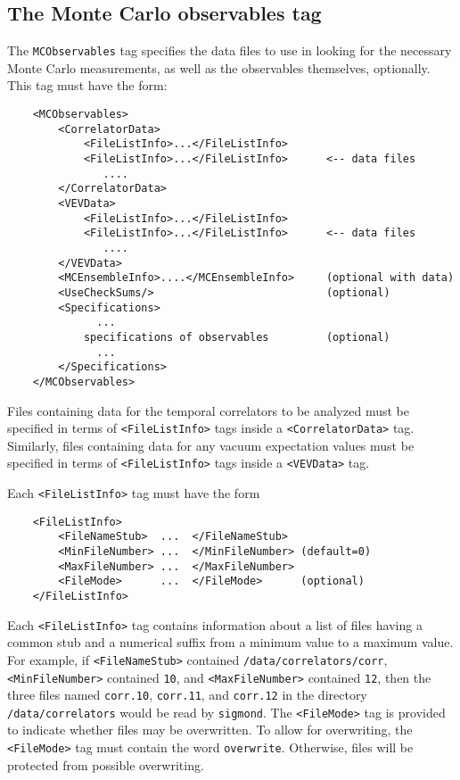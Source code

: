 \documentclass[12pt]{article}
\newcommand{\vb}{\texttt}
\begin{document}
\subsection{The Monte Carlo observables tag}
The \vb{MCObservables} tag specifies the data files to use in looking
for the necessary Monte Carlo measurements, as well as the observables
themselves, optionally.  This tag must have the form:
\begin{verbatim}
    <MCObservables>
        <CorrelatorData>
            <FileListInfo>...</FileListInfo>
            <FileListInfo>...</FileListInfo>      <-- data files
               .... 
        </CorrelatorData>
        <VEVData> 
            <FileListInfo>...</FileListInfo>
            <FileListInfo>...</FileListInfo>      <-- data files
               ....
        </VEVData>
        <MCEnsembleInfo>....</MCEnsembleInfo>     (optional with data)
        <UseCheckSums/>                           (optional)
        <Specifications>
              ... 
            specifications of observables         (optional)
              ...   
        </Specifications>
    </MCObservables>
\end{verbatim}

Files containing data for the temporal correlators to be analyzed
must be specified in terms of \vb{<FileListInfo>} tags inside a
\vb{<CorrelatorData>} tag.  Similarly, files containing data for
any vacuum expectation values must be specified in terms
of \vb{<FileListInfo>} tags inside a \vb{<VEVData>} tag.

Each \vb{<FileListInfo>} tag must have the form
\begin{verbatim}
    <FileListInfo>
        <FileNameStub>  ...  </FileNameStub>
        <MinFileNumber> ...  </MinFileNumber> (default=0)
        <MaxFileNumber> ...  </MaxFileNumber>
        <FileMode>      ...  </FileMode>      (optional)
    </FileListInfo>
\end{verbatim}
Each \vb{<FileListInfo>} tag contains information about a list of files
having a common stub and a numerical suffix from a minimum value to a 
maximum value. For example, if \vb{<FileNameStub>} contained
\vb{/data/correlators/corr}, \vb{<MinFileNumber>} contained
\vb{10}, and \vb{<MaxFileNumber>} contained \vb{12}, then
the three files named \vb{corr.10}, \vb{corr.11}, and \vb{corr.12}
in the directory \vb{/data/correlators} would be read by \vb{sigmond}.
The \vb{<FileMode>} tag is provided to indicate whether
files may be overwritten. To allow for overwriting, the
\vb{<FileMode>} tag must contain the word \vb{overwrite}. Otherwise,
files will be protected from possible overwriting.
\end{document}
